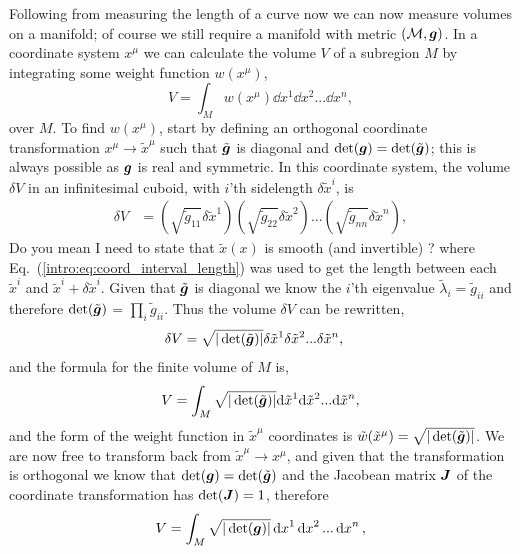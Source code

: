 Following from measuring the length of a curve now we can now measure volumes on a manifold; of course we still require a manifold with metric $(\mathcal{M},\boldsymbol{g})$. In a coordinate system $x^\mu$ we can calculate the volume $V$ of a subregion $M$ by integrating some weight function $w(x^\mu)$,
\begin{equation}
V = \int_{M} w(x^\mu) \dd x^1 \dd x^2 ... \dd x^n,
\end{equation}
over $M$. To find $w(x^\mu)$, start by defining an orthogonal coordinate transformation $x^\mu \rightarrow \tilde{x}^\mu$ such that $\tilde{\boldsymbol{g}}$ is diagonal and $\det(\boldsymbol{g})=\det(\tilde{\boldsymbol{g}})$; this is always possible as $\boldsymbol{g}$ is real and symmetric. In this coordinate system, the volume $\delta V$ in an infinitesimal cuboid, with $i$'th sidelength $\delta \tilde{x}^i$, is
\begin{align}
\delta V &=  \left( \sqrt{\tilde{g}_{11}}\delta \tilde{x}^1 \right)\left(\sqrt{\tilde{g}_{22}}\delta \tilde{x}^2 \right)... \left(\sqrt{\tilde{g}_{nn}}\delta \tilde{x}^n\right) , 
\end{align}
\color{choral} Do you mean I need to state that $\tilde{x}(x)$ is smooth (and invertible) ? \color{black}
where Eq.~(\ref{intro:eq:coord_interval_length}) was used to get the length between each $\tilde{x}^i$ and $\tilde{x}^i + \delta \tilde{x}^i$. Given that $\tilde{\boldsymbol{g}}$ is diagonal we know the $i$'th eigenvalue $\tilde{\lambda}_i = \tilde{g}_{ii}$ and therefore $\det(\tilde{\boldsymbol{g}})$ = $\prod_i \tilde{g}_{ii}$. Thus the volume $\delta V$ can be rewritten,
\begin{align}
\delta V &=  \sqrt{|\det(\tilde{\boldsymbol{g}})|}\delta \tilde{x}^1 \delta \tilde{x}^2  ... \delta \tilde{x}^n , 
\end{align} 
and the formula for the finite volume of $M$ is,
\begin{equation} \label{intro:eq:volume_curved}
V = \int_{M} \sqrt{|\det(\tilde{\boldsymbol{g}})|} \dd \tilde{x}^1 \dd \tilde{x}^2 ... \dd \tilde{x}^n,
\end{equation}
and the form of the weight function in $\tilde{x}^\mu$ coordinates is $\tilde{w}(\tilde{x}^\mu)= \sqrt{|\det(\tilde{\boldsymbol{g}})|}$.
We are now free to transform back from $\tilde{x}^\mu\rightarrow x^\mu$, and given that the transformation is orthogonal we know that $\det(\boldsymbol{g})=\det(\tilde{\boldsymbol{g}})$ and the Jacobean matrix $\boldsymbol{J}$ of the coordinate transformation has $\det({\boldsymbol{J}})=1$, therefore
\begin{equation}\label{intro:eq:volume_curved2}
V = \int_{M} \sqrt{|\det({\boldsymbol{g}})|} \dd {x}^1 \dd {x}^2 ... \dd {x}^n,
\end{equation}
